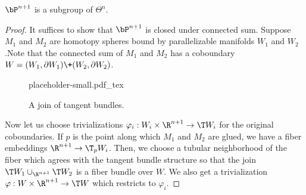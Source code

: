 \begin{proposition}
	$\bP^{n+1}$ is a subgroup of $\Theta^n$.
\end{proposition}
\begin{proof}
	It suffices to show that $\bP^{n+1}$ is closed under connected sum. Suppose $M_1$ and $M_2$ are homotopy spheres bound by parallelizable manifolds $W_1$ and $W_2$.Note that the connected sum of $M_1$ and $M_2$ has a coboundary $W=(W_1,\partial W_1)\+(W_2,\partial W_2)$.

	\begin{figure}[ht]
		\centering
		{placeholder-small.pdf_tex}
		\caption{A join of tangent bundles.}
	\end{figure}
	
	Now let us choose trivializations $\varphi_i : W_i\times \R^{n+1} \to \T W_i$ for the original coboundaries. If $p$ is the point along which $M_1$ and $M_2$ are glued, we have a fiber embeddings $\R^{n+1}\to \T_p W_i$. Then, we choose a tubular neighborhood of the fiber which agrees with the tangent bundle structure so that the join $\T W_1\cup_{\R^{n+1}}\T W_2$ is a fiber bundle over $W$. We also get a trivialization $\varphi : W\times \R^{n+1} \to \T W$ which restricts to $\varphi_i$.
\end{proof}
